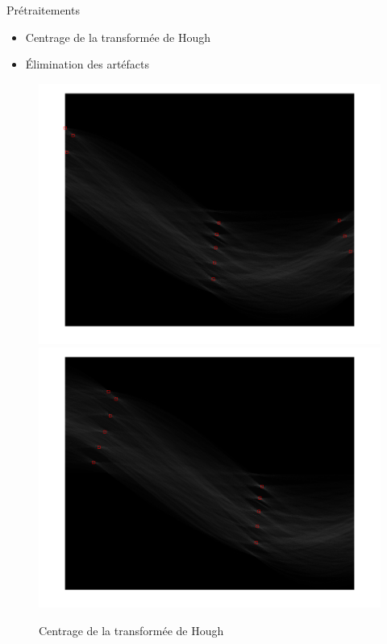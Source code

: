 \begin{frame}{Prétraitements}
\begin{itemize}
	\item Centrage de la transformée de Hough
	\item Élimination des artéfacts
\end{itemize}

\begin{figure}[h]
\begin{center}
\includegraphics[width = 0.5 \columnwidth]{fig/centrageavt.png}
\includegraphics[width = 0.5 \columnwidth]{fig/centrageapres.png}
\caption{\label{centrage} Centrage de la transformée de Hough}
\end{center}
\end{figure}
\end{frame}

